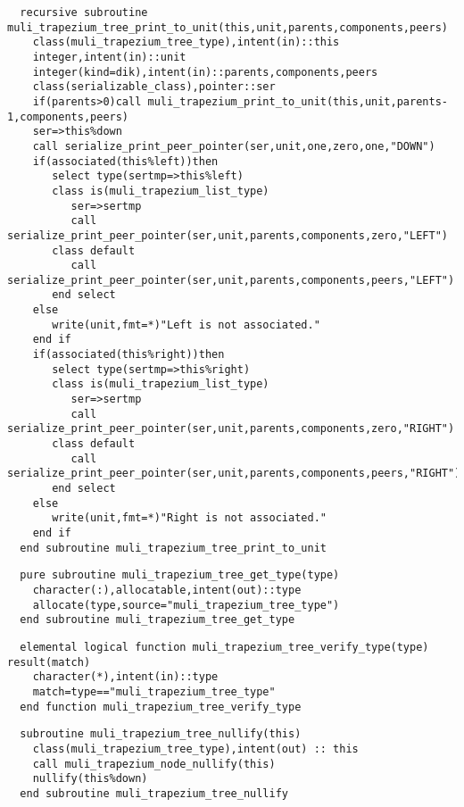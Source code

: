 \begin{Verbatim}
  recursive subroutine muli_trapezium_tree_print_to_unit(this,unit,parents,components,peers)
    class(muli_trapezium_tree_type),intent(in)::this
    integer,intent(in)::unit
    integer(kind=dik),intent(in)::parents,components,peers
    class(serializable_class),pointer::ser
    if(parents>0)call muli_trapezium_print_to_unit(this,unit,parents-1,components,peers)
    ser=>this%down
    call serialize_print_peer_pointer(ser,unit,one,zero,one,"DOWN")
    if(associated(this%left))then
       select type(sertmp=>this%left)
       class is(muli_trapezium_list_type)
          ser=>sertmp
          call serialize_print_peer_pointer(ser,unit,parents,components,zero,"LEFT")
       class default
          call serialize_print_peer_pointer(ser,unit,parents,components,peers,"LEFT")
       end select
    else
       write(unit,fmt=*)"Left is not associated."
    end if
    if(associated(this%right))then
       select type(sertmp=>this%right)
       class is(muli_trapezium_list_type)
          ser=>sertmp
          call serialize_print_peer_pointer(ser,unit,parents,components,zero,"RIGHT")
       class default
          call serialize_print_peer_pointer(ser,unit,parents,components,peers,"RIGHT")
       end select
    else
       write(unit,fmt=*)"Right is not associated."
    end if
  end subroutine muli_trapezium_tree_print_to_unit
\end{Verbatim}
\begin{Verbatim}
  pure subroutine muli_trapezium_tree_get_type(type)
    character(:),allocatable,intent(out)::type
    allocate(type,source="muli_trapezium_tree_type")
  end subroutine muli_trapezium_tree_get_type
\end{Verbatim}
\begin{Verbatim}
  elemental logical function muli_trapezium_tree_verify_type(type) result(match)
    character(*),intent(in)::type
    match=type=="muli_trapezium_tree_type"
  end function muli_trapezium_tree_verify_type
\end{Verbatim}
\begin{Verbatim}
  subroutine muli_trapezium_tree_nullify(this)
    class(muli_trapezium_tree_type),intent(out) :: this
    call muli_trapezium_node_nullify(this)
    nullify(this%down)
  end subroutine muli_trapezium_tree_nullify
\end{Verbatim}
  
